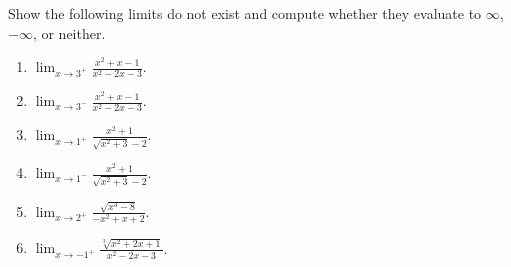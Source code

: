 Show the following limits do not exist and compute whether they evaluate to $\infty $, $-\infty$, or neither. 
\begin{multicols}{3}
\begin{enumerate}
\item $\displaystyle\lim_{x\to 3^+} \frac{x^{2}+x-1}{x^2-2x-3} $.
\item $\displaystyle\lim_{x\to 3^-} \frac{x^{2}+x-1}{x^2-2x-3} $.
\item $\displaystyle\lim_{x\to 1^+} \frac{x^2+1}{\sqrt{x^2+3 }-2} $.
\item $\displaystyle\lim_{x\to 1^-} \frac{x^2+1}{\sqrt{x^2+3 }-2} $.
\item $\displaystyle\lim_{x\to 2^+} \frac{\sqrt{x^3-8}}{ -x^2+x+2} $.
\item $\displaystyle\lim_{x\to -1^+} \frac{\sqrt[3]{x^2+2x+1}}{ x^2-2x-3} $.

\end{enumerate}
\end{multicols}
